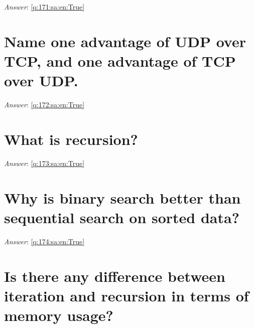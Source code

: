 \documentclass[a4paper,11pt,oneside]{book}
\begin{document}
\begin{sloppypar}
\vspace{1cm}

\textit{Answer}: \autoref{q:171:sa:en:True}



\section{Name one advantage of UDP over TCP, and one advantage of TCP over UDP.}

\label{q:172:sa:en:False}

\vspace{2cm}

\noindent\makebox[\textwidth]{\hrulefill}

\vspace{1cm}

\textit{Answer}: \autoref{q:172:sa:en:True}



\section{What is recursion?}

\label{q:173:sa:en:False}

\vspace{2cm}

\noindent\makebox[\textwidth]{\hrulefill}

\vspace{1cm}

\textit{Answer}: \autoref{q:173:sa:en:True}



\section{Why is binary search better than sequential search on sorted data?}

\label{q:174:sa:en:False}

\vspace{2cm}

\noindent\makebox[\textwidth]{\hrulefill}

\vspace{1cm}

\textit{Answer}: \autoref{q:174:sa:en:True}



\section{Is there any difference between iteration and recursion in terms of memory usage?}


\end{sloppypar}
\end{document}
